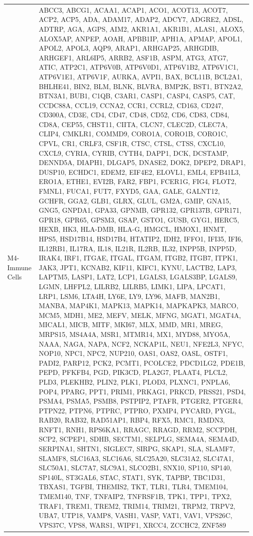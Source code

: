\documentclass[
]{article}
\begin{document}
\begin{singlespace}
\begin{longtable}[t]{>{\raggedright\arraybackslash}p{1in}>{\raggedright\arraybackslash}p{5in}}
M4-Immune Cells & ABCC3, ABCG1, ACAA1, ACAP1, ACO1, ACOT13, ACOT7, ACP2, ACP5, ADA, ADAM17, ADAP2, ADCY7, ADGRE2, ADSL, ADTRP, AGA, AGPS, AIM2, AKR1A1, AKR1B1, ALAS1, ALOX5, ALOX5AP, ANPEP, AOAH, APBB1IP, APH1A, APMAP, APOL1, APOL2, APOL3, AQP9, ARAP1, ARHGAP25, ARHGDIB, ARHGEF1, ARL6IP5, ARRB2, ASF1B, ASPM, ATG3, ATG7, ATIC, ATP2C1, ATP6V0B, ATP6V0D1, ATP6V1B2, ATP6V1C1, ATP6V1E1, ATP6V1F, AURKA, AVPI1, BAX, BCL11B, BCL2A1, BHLHE41, BIN2, BLM, BLNK, BLVRA, BMP2K, BST1, BTN2A2, BTN3A1, BUB1, C1QB, C3AR1, CASP1, CASP4, CASP5, CAT, CCDC88A, CCL19, CCNA2, CCR1, CCRL2, CD163, CD247, CD300A, CD3E, CD4, CD47, CD48, CD52, CD6, CD83, CD84, CD8A, CEP55, CHST11, CIITA, CLCN7, CLEC2D, CLEC7A, CLIP4, CMKLR1, COMMD9, CORO1A, CORO1B, CORO1C, CPVL, CR1, CRLF3, CSF1R, CTSC, CTSL, CTSS, CXCL10, CXCL9, CYRIA, CYRIB, CYTH4, DAPP1, DCK, DCSTAMP, DENND5A, DIAPH1, DLGAP5, DNASE2, DOK2, DPEP2, DRAP1, DUSP10, ECHDC1, EDEM2, EIF4E2, ELOVL1, EML4, EPB41L3, ERO1A, ETHE1, EVI2B, FAR2, FBP1, FCER1G, FIG4, FLOT2, FMNL1, FUCA1, FUT7, FXYD5, GAA, GALE, GALNT12, GCHFR, GGA2, GLB1, GLRX, GLUL, GM2A, GMIP, GNA15, GNG5, GNPDA1, GPA33, GPNMB, GPR132, GPR137B, GPR171, GPR18, GPR65, GPSM3, GSAP, GSTO1, GUSB, GYG1, HERC5, HEXB, HK3, HLA-DMB, HLA-G, HMGCL, HMOX1, HNMT, HPS5, HSD17B14, HSD17B4, HTATIP2, IDH2, IFFO1, IFI35, IFI6, IL12RB1, IL17RA, IL18, IL21R, IL2RB, IL32, INPP5B, INPP5D, IRAK4, IRF1, ITGAE, ITGAL, ITGAM, ITGB2, ITGB7, ITPK1, JAK3, JPT1, KCNAB2, KIF11, KIFC1, KYNU, LACTB2, LAP3, LAPTM5, LASP1, LAT2, LCP1, LGALS3, LGALS3BP, LGALS9, LGMN, LHFPL2, LILRB2, LILRB5, LIMK1, LIPA, LPCAT1, LRP1, LSM6, LTA4H, LY6E, LY9, LY96, MAFB, MAN2B1, MANBA, MAP4K1, MAPK13, MAPK14, MAPKAPK3, MARCO, MCM5, MDH1, ME2, MEFV, MELK, MFNG, MGAT1, MGAT4A, MICAL1, MICB, MITF, MKI67, MLX, MMD, MR1, MREG, MRPS15, MS4A4A, MSR1, MTMR14, MX1, MYD88, MYO5A, NAAA, NAGA, NAPA, NCF2, NCKAP1L, NEU1, NFE2L3, NFYC, NOP10, NPC1, NPC2, NUP210, OAS1, OAS2, OASL, OSTF1, PADI2, PARP12, PCK2, PCMT1, PCOLCE2, PDCD1LG2, PDE1B, PEPD, PFKFB4, PGD, PIK3CD, PLA2G7, PLAAT4, PLCL2, PLD3, PLEKHB2, PLIN2, PLK1, PLOD3, PLXNC1, PNPLA6, POP4, PPARG, PPT1, PRIM1, PRKAG1, PRKCD, PRSS21, PSD4, PSMA4, PSMA5, PSMB8, PSTPIP2, PTAFR, PTGER2, PTGER4, PTPN22, PTPN6, PTPRC, PTPRO, PXMP4, PYCARD, PYGL, RAB20, RAB32, RAD51AP1, RBP4, RFX5, RMC1, RMDN3, RNFT1, RNH1, RPS6KA1, RRAGC, RRAGD, RRM2, SCCPDH, SCP2, SCPEP1, SDHB, SECTM1, SELPLG, SEMA4A, SEMA4D, SERPINA1, SHTN1, SIGLEC7, SIRPG, SKAP1, SLA, SLAMF7, SLAMF8, SLC16A3, SLC16A6, SLC25A20, SLC31A2, SLC47A1, SLC50A1, SLC7A7, SLC9A1, SLCO2B1, SNX10, SP110, SP140, SP140L, ST3GAL6, STAC, STAT1, SYK, TAPBP, TBC1D31, TBXAS1, TGFBI, THEMIS2, TKT, TLR1, TLR4, TMEM104, TMEM140, TNF, TNFAIP2, TNFRSF1B, TPK1, TPP1, TPX2, TRAF1, TREM1, TREM2, TRIM14, TRIM21, TRPM2, TRPV2, UBA7, UTP18, VAMP8, VASH1, VASP, VAT1, VAV1, VPS26C, VPS37C, VPS8, WARS1, WIPF1, XRCC4, ZCCHC2, ZNF589\\

\end{longtable}
\end{singlespace}
\end{document}
